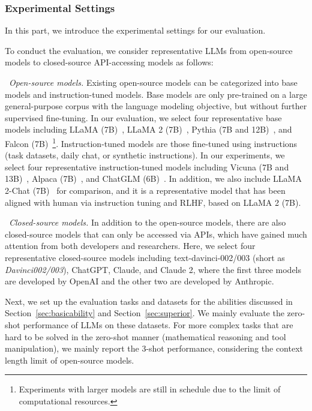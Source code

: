 \subsubsection{Experimental Settings}
In this part, we introduce the experimental settings for our evaluation.

To conduct the evaluation, we consider representative LLMs from open-source models to closed-source API-accessing models as follows:

\textbullet~\emph{Open-source models.} 
Existing open-source models can be categorized into base models and instruction-tuned models. Base models are only pre-trained on a large general-purpose corpus with the language modeling objective, but without further supervised fine-tuning. In our evaluation, we select four representative base models including LLaMA (7B)~\cite{Touvron-arxiv-2023-LLaMA}, LLaMA 2 (7B)~\cite{Touvron-2023-llama2-arxiv}, Pythia (7B and 12B)~\cite{Biderman-arxiv-2023-Pythia}, and Falcon (7B)~\cite{Ebtesam-arxiv-2023-Falcon}\footnote{Experiments with larger models are still in schedule due to the limit of computational resources. }. 
Instruction-tuned models are those fine-tuned using instructions (\ie task datasets, daily chat, or synthetic instructions). In our experiments, we select four representative instruction-tuned models including Vicuna (7B and 13B)~\cite{vicuna2023}, Alpaca (7B)~\cite{alpaca}, and ChatGLM (6B)~\cite{Zeng-arxiv-2022-GLM}.
{In addition, we also include LLaMA 2-Chat (7B)~\cite{Touvron-2023-llama2-arxiv} for comparison, and it is a representative model that has been aligned with human via instruction tuning and RLHF, based on LLaMA 2 (7B).}

\textbullet~\emph{Closed-source models.} 
In addition to the open-source models, there are also closed-source models that can only be accessed via APIs, which have gained much attention from both developers and researchers. 
Here, we select four representative closed-source models including text-davinci-002/003 (short as \emph{Davinci002/003}), ChatGPT, Claude, %
{and Claude 2, where the first three models are developed by OpenAI and the other two are developed by Anthropic.}


 Next, we set up the evaluation tasks and datasets for the abilities discussed in  Section~\ref{sec:basicability} and Section~\ref{sec:superior}.  %
{We mainly evaluate the zero-shot performance of LLMs on these datasets. For more complex tasks that are hard to be solved in the zero-shot manner (\eg mathematical reasoning and tool manipulation), we mainly report the 3-shot performance, considering the context length limit of open-source models. 
}


